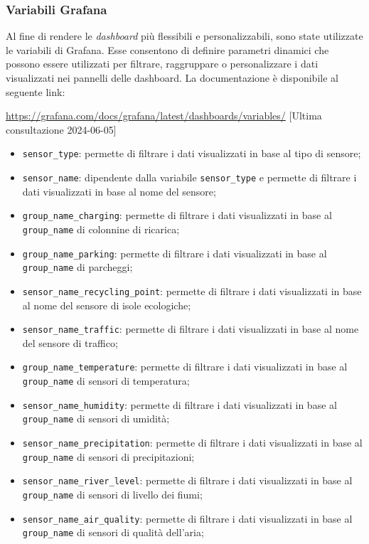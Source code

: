 \subsubsection{Variabili Grafana}
Al fine di rendere le \textit{dashboard} più flessibili e personalizzabili, sono state utilizzate le variabili di Grafana. Esse consentono di definire parametri dinamici che possono essere utilizzati per filtrare, raggruppare o personalizzare i dati visualizzati nei pannelli delle dashboard.
La documentazione è disponibile al seguente link:
\begin{center}
	\url{https://grafana.com/docs/grafana/latest/dashboards/variables/} [Ultima consultazione 2024-06-05]
\end{center}
\begin{itemize}
	\item \texttt{sensor\_type}: permette di filtrare i dati visualizzati in base al tipo di sensore;
	\item \texttt{sensor\_name}: dipendente dalla variabile \texttt{sensor\_type} e permette di filtrare i dati visualizzati in base al nome del sensore;
\end{itemize}

\begin{itemize}
	\item \texttt{group\_name\_charging}: permette di filtrare i dati visualizzati in base al \texttt{group\_name} di colonnine di ricarica;
	\item \texttt{group\_name\_parking}: permette di filtrare i dati visualizzati in base al \texttt{group\_name} di parcheggi;
	\item \texttt{sensor\_name\_recycling\_point}: permette di filtrare i dati visualizzati in base al nome del sensore di isole ecologiche;
	\item \texttt{sensor\_name\_traffic}: permette di filtrare i dati visualizzati in base al nome del sensore di traffico;
\end{itemize}
\begin{itemize}
	\item \texttt{group\_name\_temperature}: permette di filtrare i dati visualizzati in base al \texttt{group\_name} di sensori di temperatura;
	\item \texttt{sensor\_name\_humidity}: permette di filtrare i dati visualizzati in base al \texttt{group\_name} di sensori di umidità;
	\item \texttt{sensor\_name\_precipitation}: permette di filtrare i dati visualizzati in base al \texttt{group\_name} di sensori di precipitazioni;
	\item \texttt{sensor\_name\_river\_level}: permette di filtrare i dati visualizzati in base al \texttt{group\_name} di sensori di livello dei fiumi;
	\item \texttt{sensor\_name\_air\_quality}: permette di filtrare i dati visualizzati in base al \texttt{group\_name} di sensori di qualità dell'aria;
\end{itemize}

